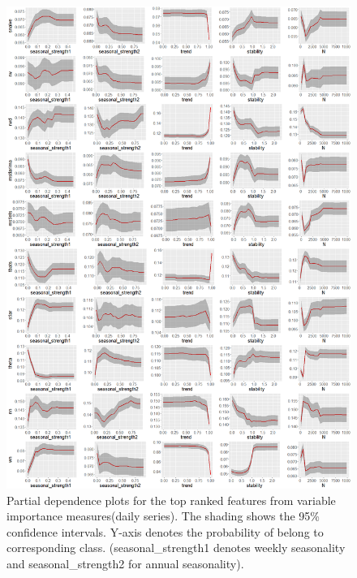 \documentclass[11pt,a4paper,]{article}
\begin{document}
\begin{figure}
\centering
\includegraphics{figures/dailypdp-1.png}
\caption{\label{fig:dailypdp}Partial dependence plots for the top ranked
features from variable importance measures(daily series). The shading
shows the 95\% confidence intervals. Y-axis denotes the probability of
belong to corresponding class. (seasonal\_strength1 denotes weekly
seasonality and seasonal\_strength2 for annual seasonality).}
\end{figure}

\newpage
\end{document}
